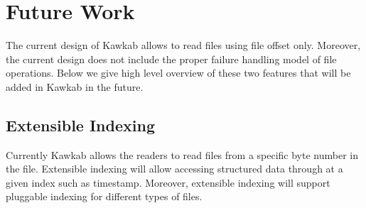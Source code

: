 \documentclass[]{article}
\begin{document}
\section{Future Work}

The current design of Kawkab allows to read files using file offset only.
Moreover, the current design does not include the proper failure handling 
model of file operations. Below we give high level overview of these two 
features that will be added in Kawkab in the future.


\subsection{Extensible Indexing}

Currently Kawkab allows the readers to read files from a specific
byte number in the file. Extensible indexing will allow accessing structured
data through at a given index such as timestamp. Moreover, extensible indexing
will support pluggable indexing for different types of files.

%
%
%
%
%
\end{document}
